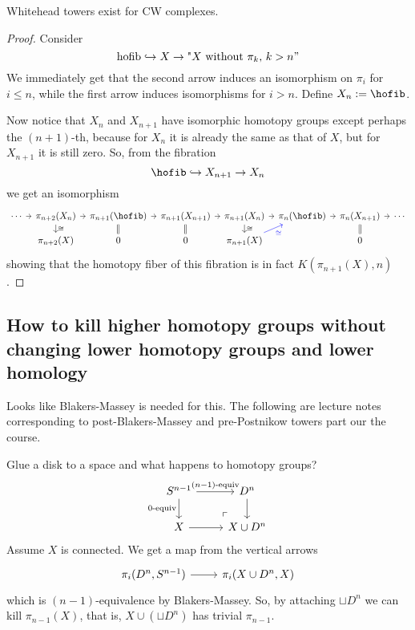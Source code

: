 \begin{lemma}
Whitehead towers exist for CW complexes.
\end{lemma}
\begin{proof}
	Consider
	$$\text{hofib}\hookrightarrow X\to \text{"$X$ without $\pi_{k}$, $k>n$}"$$
	We immediately get that the second arrow induces an isomorphism on $\pi_{i}$ for $i\leq n$, while the first arrow induces isomorphisms for $i>n$. Define $ X_{n}:=\hofib$.

	Now notice that $X_n$ and $X_{n+1}$ have isomorphic homotopy groups except perhaps the $(n+1)$-th, because for $X_{n}$ it is already the same as that of $X$, but for $X_{n+1}$ it is still zero. So, from the fibration
	$$\hofib \hookrightarrow X_{n+1}\to X_{n}$$
	we get an isomorphism
	$$\begin{tikzcd}[column sep=tiny,row sep=small]
		\cdots\arrow[r]&\pi_{n+2}(X_{n})\arrow[r]\arrow[d,"\cong "]&\pi_{n+1}(\hofib )\arrow[d,equals]\arrow[r]&\pi_{n+1}(X_{n+1})\arrow[r]\arrow[d,equals]&\pi_{n+1}(X_{n})\arrow[r]\arrow[d,"\cong "]&\pi_{n}(\hofib )\arrow[r]&\pi_{n}(X_{n+1})\arrow[r]\arrow[d,equals]&\cdots\\
			       &\pi_{n+2}(X)&0&0&\pi_{n+1}(X)\arrow[ur,blue,"{\color{blue}\cong }",swap]&&0&
		\end{tikzcd}$$
	showing that the homotopy fiber of this fibration is in fact $K(\pi_{n+1}(X),n)$.
	
\end{proof}

\subsection{How to kill higher homotopy groups without changing lower homotopy groups and lower homology}

{\color{cyan}Looks like Blakers-Massey is needed for this. The following are lecture notes corresponding to post-Blakers-Massey and pre-Postnikow towers part our the course.}

Glue a disk to a space and what happens to homotopy groups?
$$\begin{tikzcd}
	S^{n-1}\arrow[r,"(n-1)\text{-equiv}"]\arrow[d,"0\text{-equiv}",swap]&D^n\arrow[d]\\
	X\arrow[r]&X\cup D^n\arrow[ul, phantom, "\ulcorner", very near start]
\end{tikzcd}$$
Assume $X$ is connected. We get a map from the vertical arrows
$$\begin{tikzcd}
	\pi_i(D^n,S^{n-1})\arrow[r]&\pi_i(X\cup D^n,X)
\end{tikzcd}$$
which is $(n-1)$-equivalence by Blakers-Massey. So, by attaching $\sqcup D^n$ we can kill $\pi_{n-1}(X)$, that is, $X\cup(\sqcup D^n)$ has trivial $\pi_{n-1}$.

